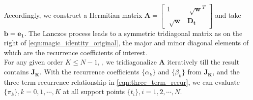 \documentclass[11pt,letter]{article}
\begin{document}
Accordingly, we construct a Hermitian matrix $\mathbf{A}=\begin{bmatrix}1 &\sqrt[]{\mathbf{w}}^T\\\sqrt[]{\mathbf{w}} &\mathbf{D_t} \end{bmatrix}$ and take $\mathbf{b}=\mathbf{e_1}$. The Lanczos process leads to a symmetric tridiagonal matrix as on the right of \eqref{eqn:magic_identity_original}, the major and minor diagonal elements of which are the recurrence coefficients of interest. \\

For any given order $K\leq N-1$, , we tridiagonalize $\mathbf{A}$ iteratively till the result contains $\mathbf{J_K}$. With the recurrence coefficients $\{\alpha_k\}$ and $\{\beta_k\}$ from $\mathbf{J_K}$, and the three-term recurrence relationship in \eqref{eqn:three_term_recur}, we can evaluate $\{\pi_k\},k=0,1,\cdots,K$ at all support points $\{t_i\},i=1,2,\cdots,N$.\\
\end{document}
